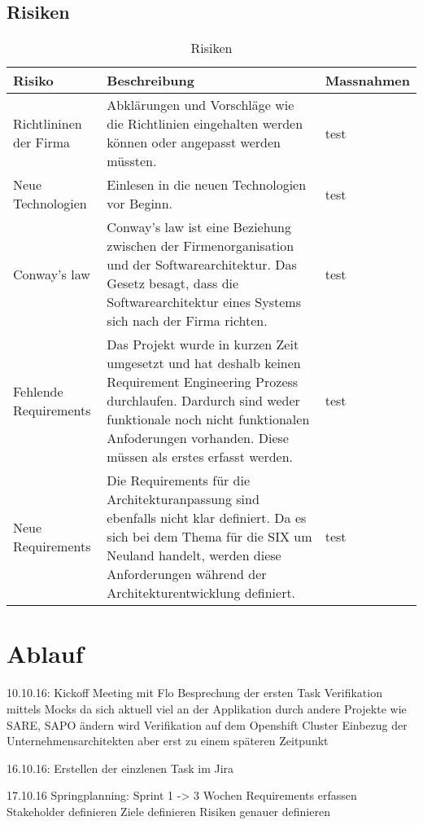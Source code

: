 \begin{landscape}
\thispagestyle{empty}

\section{Risiken}
	\begin{table}[h!]
		\centering
		\caption{Risiken}
		\label{tab:table1}
		\begin{tabular}{ | p{2cm} | p{10cm} | p{10cm} | }
			\toprule
			{\textbf{Risiko}} & {\textbf{Beschreibung}} & {\textbf{Massnahmen}} \\
			\midrule
			Richtlininen der Firma & Abklärungen und Vorschläge wie die Richtlinien eingehalten werden können oder angepasst werden müssten. & test \\ \hline
			Neue Technologien & Einlesen in die neuen Technologien vor Beginn. & test \\ \hline
			Conway's law & Conway's law ist eine Beziehung zwischen der Firmenorganisation und der Softwarearchitektur. Das Gesetz besagt, dass die Softwarearchitektur eines Systems sich nach der Firma richten. & test \\ \hline
			Fehlende Requirements & Das Projekt wurde in kurzen Zeit umgesetzt und hat deshalb keinen Requirement Engineering Prozess durchlaufen. Dardurch sind weder funktionale noch nicht funktionalen Anfoderungen vorhanden. Diese müssen als erstes erfasst werden. & test \\ \hline
			Neue Requirements & Die Requirements für die Architekturanpassung sind ebenfalls nicht klar definiert. Da es sich bei dem Thema für die SIX um Neuland handelt, werden diese Anforderungen während der Architekturentwicklung definiert. & test\\
			\bottomrule
		\end{tabular}
	\end{table}
\vfill
\raisebox{0pt}{\makebox[\linewidth][r]{\thepage}}
\end{landscape}
\restoregeometry

\section{Ablauf}

10.10.16:
Kickoff Meeting mit Flo
Besprechung der ersten Task
Verifikation mittels Mocks da sich aktuell viel an der Applikation durch andere Projekte wie SARE, SAPO ändern wird
Verifikation auf dem Openshift Cluster
Einbezug der Unternehmensarchitekten aber erst zu einem späteren Zeitpunkt

16.10.16:
Erstellen der einzlenen Task im Jira

17.10.16
Springplanning:
Sprint 1 -> 3 Wochen
Requirements erfassen
Stakeholder definieren
Ziele definieren
Risiken genauer definieren
 